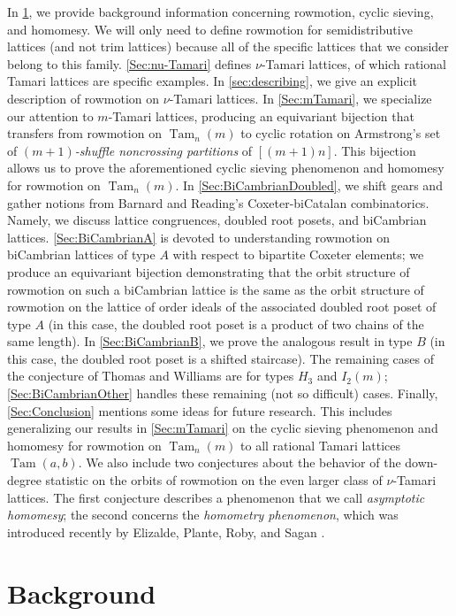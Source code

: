 \documentclass[11pt]{amsart}
\theoremstyle{definition}
\DeclareMathOperator{\Tam}{Tam}
\begin{document}
In \cref{Sec:Background}, we provide background information concerning rowmotion, cyclic sieving, and homomesy. We will only need to define rowmotion for semidistributive lattices (and not trim lattices) because all of the specific lattices that we consider belong to this family. \cref{Sec:nu-Tamari} defines $\nu$-Tamari lattices, of which rational Tamari lattices are specific examples. In \cref{sec:describing}, we give an explicit description of rowmotion on $\nu$-Tamari lattices. In \cref{Sec:mTamari}, we specialize our attention to $m$-Tamari lattices, producing an equivariant bijection that transfers from rowmotion on $\Tam_n(m)$ to cyclic rotation on Armstrong's set of \emph{$(m+1)$-shuffle noncrossing partitions} of $[(m+1)n]$. This bijection allows us to prove the aforementioned cyclic sieving phenomenon and homomesy for rowmotion on $\Tam_n(m)$. In \cref{Sec:BiCambrianDoubled}, we shift gears and gather notions from Barnard and Reading's Coxeter-biCatalan combinatorics. Namely, we discuss lattice congruences, doubled root posets, and biCambrian lattices. \cref{Sec:BiCambrianA} is devoted to understanding rowmotion on biCambrian lattices of type $A$ with respect to bipartite Coxeter elements; we produce an equivariant bijection demonstrating that the orbit structure of rowmotion on such a biCambrian lattice is the same as the orbit structure of rowmotion on the lattice of order ideals of the associated doubled root poset of type $A$ (in this case, the doubled root poset is a product of two chains of the same length). In \cref{Sec:BiCambrianB}, we prove the analogous result in type $B$ (in this case, the doubled root poset is a shifted staircase). The remaining cases of the conjecture of Thomas and Williams are for types $H_3$ and $I_2(m)$; \cref{Sec:BiCambrianOther} handles these remaining (not so difficult) cases. Finally, \cref{Sec:Conclusion} mentions some ideas for future research. This includes generalizing our results in \cref{Sec:mTamari} on the cyclic sieving phenomenon and homomesy for rowmotion on $\Tam_n(m)$ to all rational Tamari lattices $\Tam(a,b)$. We also include two conjectures about the behavior of the down-degree statistic on the orbits of rowmotion on the even larger class of $\nu$-Tamari lattices. The first conjecture describes a phenomenon that we call \emph{asymptotic homomesy}; the second concerns the \emph{homometry phenomenon}, which was introduced recently by Elizalde, Plante, Roby, and Sagan \cite{ElizaldeFences}. 



\section{Background}\label{Sec:Background}
\end{document}
